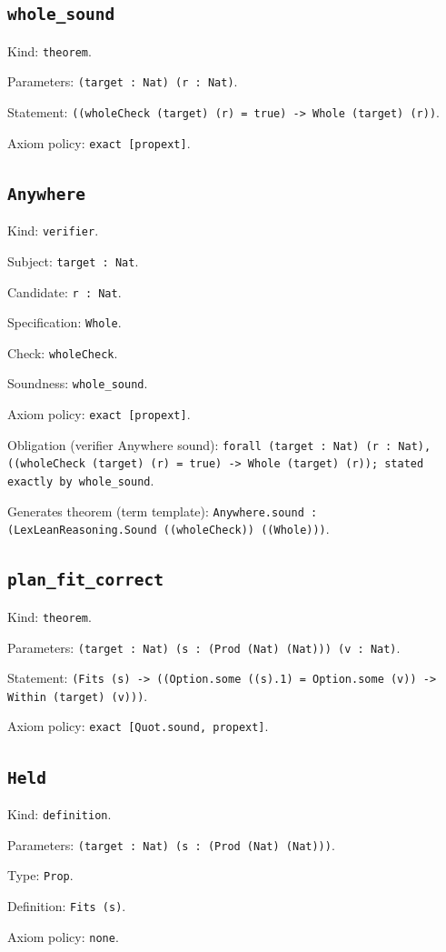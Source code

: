 \documentclass[11pt]{article}
\begin{document}
\subsection*{\texttt{whole\_sound}}
\noindent Kind: \texttt{theorem}.\par
\noindent Parameters: \texttt{(target : Nat) (r : Nat)}.\par
\noindent Statement: \texttt{((wholeCheck (target) (r) = true) -> Whole (target) (r))}.\par
\noindent Axiom policy: \texttt{exact [propext]}.\par
\subsection*{\texttt{Anywhere}}
\noindent Kind: \texttt{verifier}.\par
\noindent Subject: \texttt{target : Nat}.\par
\noindent Candidate: \texttt{r : Nat}.\par
\noindent Specification: \texttt{Whole}.\par
\noindent Check: \texttt{wholeCheck}.\par
\noindent Soundness: \texttt{whole\_sound}.\par
\noindent Axiom policy: \texttt{exact [propext]}.\par
\noindent Obligation (verifier Anywhere sound): \texttt{forall (target : Nat) (r : Nat), ((wholeCheck (target) (r) = true) -> Whole (target) (r)); stated exactly by whole\_sound}.\par
\noindent Generates theorem (term template): \texttt{Anywhere.sound : (LexLeanReasoning.Sound ((wholeCheck)) ((Whole)))}.\par
\subsection*{\texttt{plan\_fit\_correct}}
\noindent Kind: \texttt{theorem}.\par
\noindent Parameters: \texttt{(target : Nat) (s : (Prod (Nat) (Nat))) (v : Nat)}.\par
\noindent Statement: \texttt{(Fits (s) -> ((Option.some ((s).1) = Option.some (v)) -> Within (target) (v)))}.\par
\noindent Axiom policy: \texttt{exact [Quot.sound, propext]}.\par
\subsection*{\texttt{Held}}
\noindent Kind: \texttt{definition}.\par
\noindent Parameters: \texttt{(target : Nat) (s : (Prod (Nat) (Nat)))}.\par
\noindent Type: \texttt{Prop}.\par
\noindent Definition: \texttt{Fits (s)}.\par
\noindent Axiom policy: \texttt{none}.\par
\end{document}
